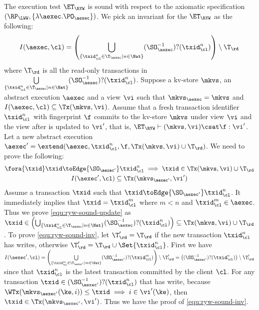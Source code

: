 The execution test $\ET_\RYW$ is sound with respect to the axiomatic specification 
$(\RP_{\LWW}, \{\lambda \aexec. \PO_{\aexec} \})$.
We pick an invariant for the \( \ET_\RYW \) as the following:
\[
    I(\aexec, \cl) = \left( \bigcup_{\{\txid_{\cl}^{n} \in \T_{\aexec} \mid n \in \Nat\}} (\SO_{\aexec}^{-1})?(\txid^n_\cl) \right) \setminus \T_\rd
\]
where \( \T_\rd \) is all the read-only transactions in \( \bigcup\limits_{\{\txid_{\cl}^{n} \in \T_{\aexec} \mid n \in \Nat\}} (\SO_{\aexec}^{-1})?(\txid^n_\cl) \).
Suppose a kv-store \( \mkvs \), an abstract execution \( \aexec \) and a view \( \vi \)
such that \( \mkvs_\aexec = \mkvs \) and \( I(\aexec, \cl) \subseteq \Tx(\mkvs, \vi) \).
Assume that a fresh transaction identifier \( \txid_\cl^n \) with fingerprint \( \f \) commits to 
the kv-store \( \mkvs \) under view \( \vi \) and the view after is updated to \( \vi' \), that is, 
\( \ET_\RYW \vdash (\mkvs, \vi) \csat \f : \vi' \).
Let a new abstract execution \( \aexec' = \extend(\aexec, \txid_\cl^n, \f, \Tx(\mkvs, \vi) \cup \T_\rd) \).
We need to prove the following:
\begin{gather}
    \fora{\txid} \txid \toEdge{\SO_{\aexec'}} \txid_\cl^n \implies \txid \in \Tx(\mkvs, \vi) \cup \T_\rd \label{equ:ryw-sound-update}\\
    I(\aexec',\cl) \subseteq \Tx(\mkvs_{\aexec'}, \vi')\label{equ:ryw-sound-inv} 
\end{gather}
Assume a transaction \( \txid \) such that \( \txid \toEdge{\SO_{\aexec'}} \txid_\cl^n \).
It immediately implies that \( \txid = \txid_\cl^m\) where \( m < n \) and \( \txid_\cl^m \in \aexec \).
Thus we prove \cref{equ:ryw-sound-update} as \( \txid \in \left( \bigcup_{\{\txid_{\cl}^{n} \in \T_{\aexec} \mid n \in \Nat\}} (\SO_{\aexec}^{-1})?(\txid^n_\cl) \right) \subseteq \Tx(\mkvs,\vi) \cup \T_\rd\).
To prove \cref{equ:ryw-sound-inv}, let \( \T'_\rd = \T_\rd \) if the new transaction \( \txid_\cl^n\) has writes, otherwise \( \T'_\rd = \T_\rd \cup \Set{\txid_\cl^n}\).
First we have \( I(\aexec', \cl) = \left(\bigcup\limits_{\{\txid_{\cl}^{m} \in \T_{\aexec'} \mid m \in \Nat\}} (\SO_{\aexec'}^{-1})?(\txid^m_\cl) \right) \setminus \T'_{\rd} = \left( (\SO_{\aexec'}^{-1})?(\txid^n_\cl) \right) \setminus \T'_\rd \)
since that  \( \txid^n_\cl \) is the latest transaction committed by the client \( \cl \).
For any transaction \( \txid \in (\SO_{\aexec'}^{-1})?(\txid^n_\cl) \) that has write,
because \( \WTx( \mkvs_{\aexec'}(\ke, i) ) \leq \txid \implies i \in \vi'(\ke) \),
then \( \txid \in \Tx(\mkvs_{\aexec'}, \vi') \).
Thus we have the proof of \cref{equ:ryw-sound-inv}.


